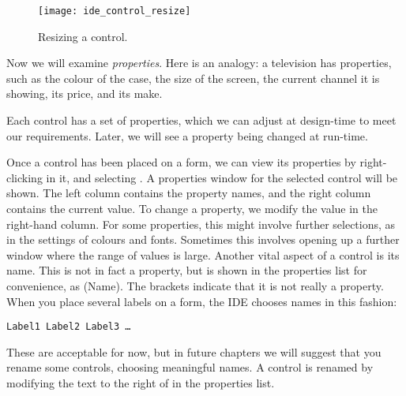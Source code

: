 		\begin{figure}[ht]
			\centering
			\texttt{[image: ide\_control\_resize]}
			\caption{Resizing a control.}
			\label{fig:ide_control_resize}
		\end{figure}


		Now we will examine \emph{properties}. Here is an analogy: a television has properties, such as the colour of the case, the size of the screen, the current channel it is showing, its price, and its make.

		Each control has a set of properties, which we can adjust at design-time to meet our requirements. Later, we will see a property being changed at run-time.
		
		Once a control has been placed on a form, we can view its properties by right-clicking in it, and selecting . A properties window for the selected control will be shown. The left column contains the property names, and the right column contains the current value. To change a property, we modify the value in the right-hand column. For some properties, this might involve further selections, as in the settings of colours and fonts. Sometimes this involves opening up a further window where the range of values is large.
Another vital aspect of a control is its name. This is not in fact a property, but is shown in the properties list for convenience, as \ui(Name). The brackets indicate that it is not really a property.
When you place several labels on a form, the IDE chooses names in this fashion:
		\begin{lstlisting}
Label1 Label2 Label3 …
		\end{lstlisting}
		These are acceptable for now, but in future chapters we will suggest that you rename some controls, choosing meaningful names. A control is renamed by modifying the text to the right of  in the properties list.

